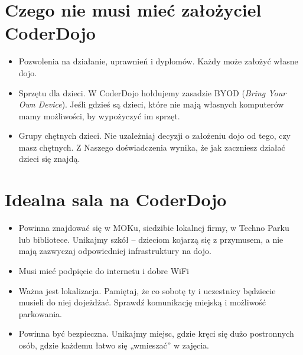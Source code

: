 \documentclass[a4paper]{article}
\begin{document}
\section{Czego nie musi mieć założyciel CoderDojo}
\begin{itemize}
\item Pozwolenia na działanie, uprawnień i dyplomów. Każdy może założyć własne dojo. 
\item Sprzętu dla dzieci. W CoderDojo hołdujemy zasadzie BYOD (\textit{Bring Your Own Device}). Jeśli gdzieś są  dzieci, które nie mają własnych komputerów mamy możliwości, by wypożyczyć im sprzęt. 
\item Grupy chętnych dzieci. Nie uzależniaj decyzji o założeniu dojo od tego, czy masz chętnych. Z Naszego doświadczenia wynika, że jak zaczniesz działać dzieci się znajdą. 
\end{itemize}

\section{Idealna sala na CoderDojo}
\begin{itemize}
\item Powinna znajdować się w MOKu, siedzibie lokalnej firmy, w Techno Parku lub bibliotece. Unikajmy szkół – dzieciom kojarzą się z przymusem, a nie mają zazwyczaj odpowiedniej infrastruktury na dojo.  
\item Musi mieć podpięcie do internetu i dobre WiFi
\item Ważna jest lokalizacja. Pamiętaj, że co sobotę ty i uczestnicy będziecie musieli do niej dojeżdżać. Sprawdź komunikację miejską i możliwość parkowania. 
\item Powinna być bezpieczna. Unikajmy miejsc, gdzie kręci się dużo postronnych osób, gdzie każdemu łatwo się „wmieszać” w zajęcia. 
\end{itemize}
\end{document}
